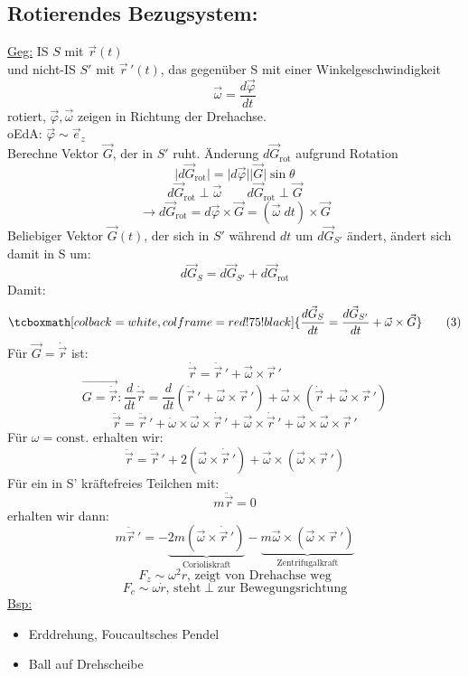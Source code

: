 \documentclass[titlepage,12pt,a4paper,ngerman]{report}
\newcommand{\tx}[1]{\textrm{#1}}
\newcommand{\const}{\tx{const.}}
\newcommand{\rmbox}[1]{\tcboxmath[colback=white,colframe=red!75!black]{#1}} %
\renewcommand{\boxed}{\rmbox}
\begin{document}
{\subsection{Rotierendes Bezugsystem:}
\underline{Geg:} IS $S$ mit $\vec{r}(t)$\\
und nicht-IS $S'$ mit $\vec{r}\,'(t)$, das gegenüber S mit einer Winkelgeschwindigkeit
\begin{equation*}
\vec{\omega} = \frac{d\vec{\varphi}}{dt} \tag{1}
\end{equation*}
rotiert, $\vec{\varphi}, \vec{\omega}$ zeigen in Richtung der Drehachse.\\
oEdA: $\vec{\varphi} \sim \vec{e}_z$\\
Berechne Vektor $\vec{G}$, der in $S'$ ruht. Änderung $d\vec{G}_{\tx{rot}}$ aufgrund Rotation
$$\vert d \vec{G}_{\tx{rot}} \vert = \vert d\vec{\varphi} \vert \vert \vec{G} \vert \sin \theta $$
$$d\vec{G}_{\tx{rot}} \perp \vec{\omega}  \qquad d\vec{G}_{\tx{rot}} \perp \vec{G}$$
\begin{equation*}
\rightarrow d\vec{G}_{\tx{rot}} = d\vec{\varphi} \times \vec{G} = (\vec{\omega}\; dt) \times \vec{G} \tag{2}
\end{equation*}
Beliebiger Vektor $\vec{G}(t)$, der sich in $S'$ während $dt$ um $d\vec{G}_{S'}$ ändert, ändert sich damit in S um:
$$d\vec{G}_{S} = d\vec{G}_{S'} + d\vec{G}_{\tx{rot}}$$
Damit:
\begin{equation*}
\boxed{\frac{d\vec{G}_{S}}{dt} = \frac{d\vec{G}_{S'}}{dt} + \vec{\omega} \times \vec{G}} \tag{3}
\end{equation*}
Für $ \vec{G} = \dot{\vec{r}}$ ist:
\begin{equation*}
\dot{\vec{r}} = \dot{\vec{r}}\,' + \vec{\omega} \times \vec{r}\,' \tag{4}
\end{equation*}
$$\vec{G = \dot{\vec{r}}} : \frac{d}{dt} \dot{\vec{r}} = \frac{d}{dt} (\dot{\vec{r}}\,' + \vec{\omega} \times \vec{r}\,' ) + \vec{\omega} \times (\dot{\vec{r}} + \vec{\omega} \times \vec{r}\,')$$
$$\ddot{\vec{r}} = \ddot{\vec{r}}\,' + \dot{\omega} \times \vec{\omega} \times \dot{\vec{r}}\,' + \vec{\omega} \times \dot{\vec{r}}\,' + \vec{\omega}\times \vec{\omega}\times \vec{r}\,'$$
Für $\omega= \const$ erhalten wir:
$$\ddot{\vec{r}} = \ddot{\vec{r}}\,' + 2(\vec{\omega} \times \dot{\vec{r}}\,') + \vec{\omega} \times ( \vec{ \omega} \times \vec{r}\,')$$
Für ein in S' kräftefreies Teilchen mit:
$$m\ddot{\vec{r}} = 0$$
erhalten wir dann:
$$m\ddot{\vec{r}}\,'= - \underbrace{2 m (\vec{\omega} \times \dot{\vec{r}}\,')}_{\tx{Corioliskraft}} -\underbrace{ m \vec{\omega}\times (\vec{\omega} \times \vec{r}\,')}_{\tx{Zentrifugalkraft}}$$
$$F_z \sim \omega^2r \textrm{, zeigt von Drehachse weg}$$
$$F_c \sim \omega\dot{r} \textrm{, steht} \perp \textrm{zur Bewegungsrichtung}$$
\underline{Bsp:} 
\begin{itemize}
	\item Erddrehung, Foucaultsches Pendel
	\item Ball auf Drehscheibe
\end{itemize}

}
\end{document}
